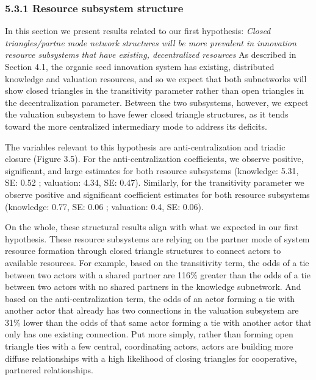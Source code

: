 \documentclass[twoside,12pt,final]{ucthesis-CA2012}
\begin{document}
\begin{ucmainmatter}
\hypertarget{resource-subsystem-structure}{%
\subsubsection{5.3.1 Resource subsystem structure}\label{resource-subsystem-structure}}

In this section we present results related to our first hypothesis:
\emph{Closed triangles/partne mode network structures will be more prevalent
in innovation resource subsystems that have existing, decentralized
resources} As described in Section 4.1, the organic seed innovation
system has existing, distributed knowledge and valuation resources, and
so we expect that both subnetworks will show closed triangles in the
transitivity parameter rather than open triangles in the
decentralization parameter. Between the two subsystems, however, we
expect the valuation subsystem to have fewer closed triangle structures,
as it tends toward the more centralized intermediary mode to address its
deficits.

The variables relevant to this hypothesis are anti-centralization and
triadic closure (Figure 3.5). For the anti-centralization coefficients,
we observe positive, significant, and large estimates for both resource
subsystems (knowledge: 5.31, SE: 0.52 ; valuation: 4.34, SE: 0.47).
Similarly, for the transitivity parameter we observe positive and
significant coefficient estimates for both resource subsystems
(knowledge: 0.77, SE: 0.06 ; valuation: 0.4, SE: 0.06).

On the whole, these structural results align with what we expected in
our first hypothesis. These resource subsystems are relying on the
partner mode of system resource formation through closed triangle
structures to connect actors to available resources. For example, based
on the transitivity term, the odds of a tie between two actors with a
shared partner are 116\% greater than the odds of a tie between two
actors with no shared partners in the knowledge subnetwork. And based on
the anti-centralization term, the odds of an actor forming a tie with
another actor that already has two connections in the valuation
subsystem are 31\% lower than the odds of that same actor forming a tie
with another actor that only has one existing connection. Put more
simply, rather than forming open triangle ties with a few central,
coordinating actors, actors are building more diffuse relationships with
a high likelihood of closing triangles for cooperative, partnered
relationships.


\end{ucmainmatter}
\end{document}
